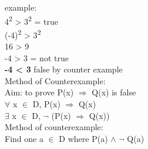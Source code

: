 \documentclass[11pt]{article}
\begin{document}
example:\\
4\textsuperscript{2} > 3\textsuperscript{2} = true\\
(-4)\textsuperscript{2} > 3\textsuperscript{2}\\
16 > 9\\
-4 > 3  = not true\\
\textbf{-4 < 3} false by counter example\\

Method of Counterexample:\\
Aim: to prove P(x) \(\Rightarrow\) Q(x) is false\\
\(\forall\) x \(\in\) D, P(x) \(\Rightarrow\) Q(x)\\
\(\exists\) x \(\in\) D, \(\neg{}\) (P(x) \(\Rightarrow\) Q(x))\\

Method of counterexample:\\
Find one a \(\in\) D where P(a) \(\land\) \(\neg{}\) Q(a)\\
\end{document}
